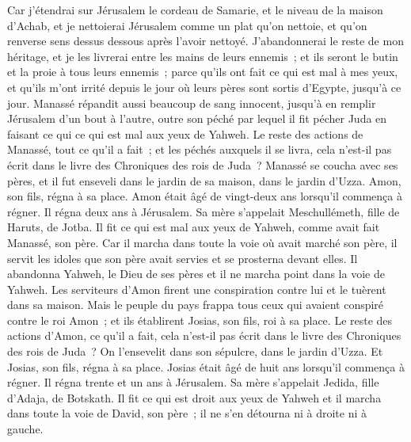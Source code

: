 \begin{multicols}{2}
Car j'étendrai sur Jérusalem le cordeau de Samarie, et le niveau de la maison d'Achab, et je nettoierai Jérusalem comme un plat qu'on nettoie, et qu'on renverse sens dessus dessous après l'avoir nettoyé.
J'abandonnerai le reste de mon héritage, et je les livrerai entre les mains de leurs ennemis~; et ils seront le butin et la proie à tous leurs ennemis~;
parce qu'ils ont fait ce qui est mal à mes yeux, et qu'ils m'ont irrité depuis le jour où leurs pères sont sortis d'Egypte, jusqu'à ce jour.
Manassé répandit aussi beaucoup de sang innocent, jusqu'à en remplir Jérusalem d'un bout à l'autre, outre son péché par lequel il fit pécher Juda en faisant ce qui ce qui est mal aux yeux de Yahweh.
Le reste des actions de Manassé, tout ce qu'il a fait~; et les péchés auxquels il se livra, cela n'est-il pas écrit dans le livre des Chroniques des rois de Juda~?
Manassé se coucha avec ses pères, et il fut enseveli dans le jardin de sa maison, dans le jardin d'Uzza. Amon, son fils, régna à sa place.
Amon était âgé de vingt-deux ans lorsqu'il commença à régner. Il régna deux ans à Jérusalem. Sa mère s'appelait Meschullémeth, fille de Haruts, de Jotba.
Il fit ce qui est mal aux yeux de Yahweh, comme avait fait Manassé, son père.
Car il marcha dans toute la voie où avait marché son père, il servit les idoles que son père avait servies et se prosterna devant elles.
Il abandonna Yahweh, le Dieu de ses pères et il ne marcha point dans la voie de Yahweh.
Les serviteurs d'Amon firent une conspiration contre lui et le tuèrent dans sa maison.
Mais le peuple du pays frappa tous ceux qui avaient conspiré contre le roi Amon~; et ils établirent Josias, son fils, roi à sa place.
Le reste des actions d'Amon, ce qu'il a fait, cela n'est-il pas écrit dans le livre des Chroniques des rois de Juda~?
On l'ensevelit dans son sépulcre, dans le jardin d'Uzza. Et Josias, son fils, régna à sa place.
\VerseOne{}Josias était âgé de huit ans lorsqu'il commença à régner. Il régna trente et un ans à Jérusalem. Sa mère s'appelait Jedida, fille d'Adaja, de Botskath.
Il fit ce qui est droit aux yeux de Yahweh et il marcha dans toute la voie de David, son père~; il ne s'en détourna ni à droite ni à gauche.

\end{multicols}
